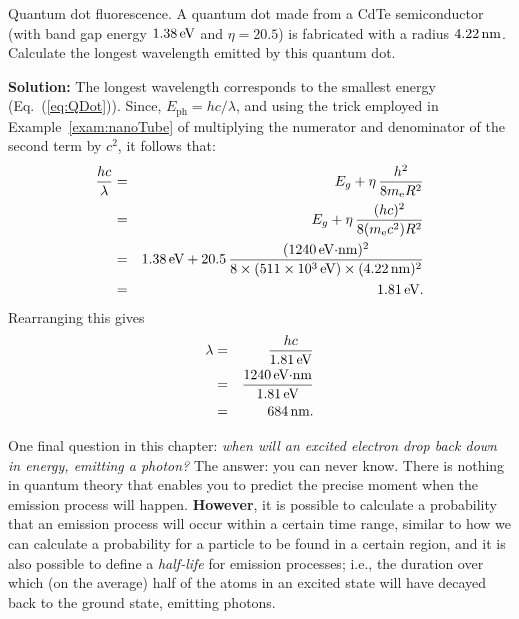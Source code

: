 \begin{example}{Quantum dot fluorescence.}
A quantum dot made from a CdTe semiconductor (with band gap energy
$1.38\,\mbox{eV}$  and $\eta = 20.5$) is fabricated with a radius 
$4.22\,\mbox{nm}$.  Calculate the longest wavelength emitted
by this quantum dot.

{\bf Solution:} The longest wavelength corresponds to the smallest
energy (Eq.~(\ref{eq:QDot})). 
Since, $E_\text{ph} = hc/\lambda$, and using the trick employed in
Example~\ref{exam:nanoTube} of multiplying the numerator and 
denominator of the second term  by $c^2$,  it follows that:
\begin{eqnarray}
\frac{hc}{\lambda} &=& E_g+\eta\,  \frac{h^2}{8m_\text{e}R^2} \nonumber \\
              &=& E_g + \eta\, \frac{(hc)^2}{8(m_\text{e}c^2) R^2} \nonumber \\
              &=& 1.38\,\mbox{eV} + 20.5\,  \frac{(1240\,\mbox{eV$\cdot$nm})^2}
                {8 \times (511\times 10^3\,\mbox{eV})\times (4.22\,\mbox{nm})^2} 
                   \nonumber \\
              &=& 1.81\,\mbox{eV}. 
\end{eqnarray}
Rearranging this gives
\begin{eqnarray}
\lambda &=& \frac{hc}{1.81\,\mbox{eV}} \nonumber \\
        &=& \frac{1240\,\mbox{eV$\cdot$nm}}{1.81\,\mbox{eV}}\nonumber \\
        &=& 684\,\mbox{nm}.
\end{eqnarray}
\end{example}

One final question in this chapter: {\it when will an excited electron
drop back down in energy, emitting a photon?} The answer: you can never
know. There is nothing in quantum theory that enables you to
predict the precise moment when the emission process will happen. {\bf However},
it is possible to calculate a probability that an emission process will
occur within a certain time range, similar to how we can calculate
a probability for a particle to be found in a certain region, and it
is also possible to define a {\it half-life} for emission processes; i.e.,
the duration over which (on the average) half of the atoms in an excited
state will have decayed back to the ground state, emitting photons.

